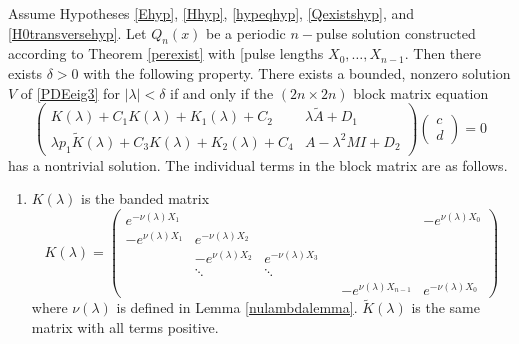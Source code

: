 \documentclass[thesis.tex]{subfiles}
\begin{document}
\begin{theorem}\label{blockmatrixtheorem}
Assume Hypotheses \ref{Ehyp}, \ref{Hhyp}, \ref{hypeqhyp}, \ref{Qexistshyp}, and \ref{H0transversehyp}. Let $Q_n(x)$ be a periodic $n-$pulse solution constructed according to Theorem \ref{perexist} with [pulse lengths $X_0, \dots, X_{n-1}$. Then there exists $\delta > 0$ with the following property. There exists a bounded, nonzero solution $V$ of \eqref{PDEeig3} for $|\lambda| < \delta$ if and only if the $(2n \times 2n)$ block matrix equation
\begin{equation}\label{blockeq}
\begin{pmatrix}
K(\lambda) + C_1 K(\lambda) + K_1(\lambda) + C_2 & \lambda \tilde{A} + D_1 \\
\lambda p_1 \tilde{K}(\lambda) + C_3 K(\lambda) + K_2(\lambda) + C_4 & A - \lambda^2 MI + D_2
\end{pmatrix}
\begin{pmatrix} c \\ d \end{pmatrix} = 0
\end{equation}
has a nontrivial solution. The individual terms in the block matrix are as follows.

\begin{enumerate}
\item $K(\lambda)$ is the banded matrix
\begin{equation}
K(\lambda) = 
\begin{pmatrix}
e^{-\nu(\lambda)X_1} & & & & & -e^{\nu(\lambda)X_0} \\
-e^{\nu(\lambda)X_1} & e^{-\nu(\lambda)X_2} \\
& -e^{\nu(\lambda)X_2} & e^{-\nu(\lambda)X_3} \\
& \ddots & \ddots & &&  \\
& & & & -e^{\nu(\lambda)X_{n-1}} & e^{-\nu(\lambda)X_0} 
\end{pmatrix}
\end{equation}
where $\nu(\lambda)$ is defined in Lemma \ref{nulambdalemma}. $\tilde{K}(\lambda)$ is the same matrix with all terms positive.


\end{enumerate}
\end{theorem}
\end{document}

